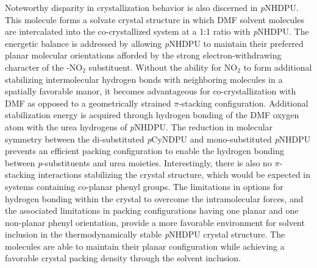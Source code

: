 Noteworthy disparity in crystallization behavior is also discerned in \textit{p}NHDPU. This molecule forms a solvate crystal structure in which DMF solvent molecules are intercalated into the co-crystallized system at a 1:1 ratio with \textit{p}NHDPU. The energetic balance is addressed by allowing \textit{p}NHDPU to maintain their preferred planar molecular orientations afforded by the strong electron-withdrawing character of the -NO$_{2}$ substituent. Without the ability for NO$_{2}$ to form additional stabilizing intermolecular hydrogen bonds with neighboring molecules in a spatially favorable manor, it becomes advantageous for co-crystallization with DMF as opposed to a geometrically strained $\pi$-stacking configuration. Additional stabilization energy is acquired through hydrogen bonding of the DMF oxygen atom with the urea hydrogens of \textit{p}NHDPU. The reduction in molecular symmetry between the di-substituted \textit{p}CyNDPU and mono-substituted \textit{p}NHDPU prevents an efficient packing configuration to enable the hydrogen bonding between \textit{p}-substituents and urea moieties. Interestingly, there is also no $\pi$-stacking interactions stabilizing the crystal structure, which would be expected in systems containing co-planar phenyl groups. The limitations in options for hydrogen bonding within the crystal to overcome the intramolecular forces, and the associated limitations in packing configurations having one planar and one non-planar phenyl orientation, provide a more favorable environment for solvent inclusion in the thermodynamically stable \textit{p}NHDPU crystal structure. The molecules are able to maintain their planar configuration while achieving a favorable crystal packing density through the solvent inclusion.

